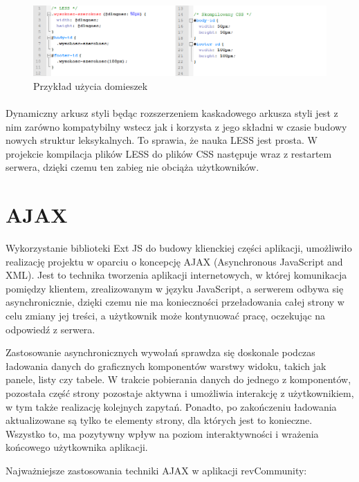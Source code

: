\begin{figure}[h]
	\centering
	\includegraphics[width=1.00\textwidth]{images/less2.png}
	\caption{Przykład użycia domieszek}
\end{figure}
\paragraph{}

Dynamiczny arkusz styli  będąc rozszerzeniem kaskadowego arkusza styli jest z nim zarówno kompatybilny wstecz jak i korzysta z jego składni w czasie budowy nowych struktur leksykalnych. To sprawia, że nauka LESS jest prosta.
W projekcie kompilacja plików LESS do plików CSS następuje wraz z restartem serwera, dzięki czemu ten zabieg nie obciąża użytkowników. \cite{LESS}


\section{AJAX}
Wykorzystanie biblioteki Ext JS do budowy klienckiej części aplikacji, umożliwiło realizację projektu w oparciu o koncepcję AJAX (Asynchronous JavaScript and XML). Jest to technika tworzenia aplikacji internetowych, w której komunikacja pomiędzy klientem, zrealizowanym w języku JavaScript, a serwerem odbywa się asynchronicznie, dzięki czemu nie ma konieczności przeładowania całej strony w celu zmiany jej treści, a użytkownik może kontynuować pracę, oczekując na odpowiedź z serwera.\cite{ajaxWoj}

Zastosowanie asynchronicznych wywołań sprawdza się doskonale podczas ładowania danych do graficznych komponentów warstwy widoku, takich jak panele, listy czy tabele. W trakcie pobierania danych do jednego z komponentów, pozostała część strony pozostaje aktywna i umożliwia interakcję z użytkownikiem, w tym także realizację kolejnych zapytań. Ponadto, po zakończeniu ładowania aktualizowane są tylko te elementy strony, dla których jest to konieczne. Wszystko to, ma pozytywny wpływ na poziom interaktywności i wrażenia końcowego użytkownika aplikacji.

Najważniejsze zastosowania techniki AJAX w aplikacji revCommunity:

